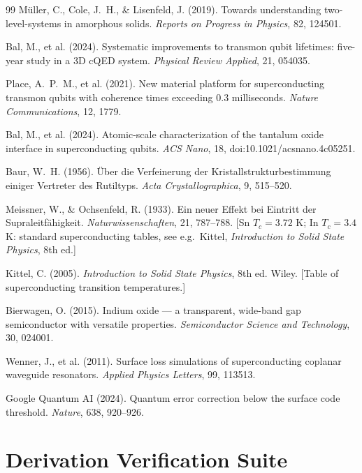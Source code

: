 \documentclass[12pt,a4paper]{article}
\begin{document}
\begin{thebibliography}{99}
M\"uller, C., Cole, J.\ H., \& Lisenfeld, J. (2019).
Towards understanding two-level-systems in amorphous solids.
\textit{Reports on Progress in Physics}, 82, 124501.

Bal, M., et al. (2024).
Systematic improvements to transmon qubit lifetimes: five-year
study in a 3D cQED system. \textit{Physical Review Applied}, 21, 054035.

Place, A.\ P.\ M., et al. (2021).
New material platform for superconducting transmon qubits with coherence
times exceeding 0.3 milliseconds.
\textit{Nature Communications}, 12, 1779.

Bal, M., et al. (2024).
Atomic-scale characterization of the tantalum oxide interface in
superconducting qubits. \textit{ACS Nano}, 18, doi:10.1021/acsnano.4c05251.

Baur, W.\ H. (1956).
\"Uber die Verfeinerung der Kristallstrukturbestimmung einiger Vertreter
des Rutiltyps. \textit{Acta Crystallographica}, 9, 515--520.

Meissner, W., \& Ochsenfeld, R. (1933).
Ein neuer Effekt bei Eintritt der Supraleitf\"ahigkeit.
\textit{Naturwissenschaften}, 21, 787--788.
[Sn $T_c = 3.72$ K; In $T_c = 3.4$ K: standard superconducting tables,
see e.g.\ Kittel, \textit{Introduction to Solid State Physics}, 8th ed.]

Kittel, C. (2005).
\textit{Introduction to Solid State Physics}, 8th ed.
Wiley. [Table of superconducting transition temperatures.]

Bierwagen, O. (2015).
Indium oxide --- a transparent, wide-band gap semiconductor with
versatile properties. \textit{Semiconductor Science and Technology}, 30, 024001.

Wenner, J., et al. (2011).
Surface loss simulations of superconducting coplanar waveguide resonators.
\textit{Applied Physics Letters}, 99, 113513.

Google Quantum AI (2024).
Quantum error correction below the surface code threshold.
\textit{Nature}, 638, 920--926.

\end{thebibliography}

\appendix
\section{Derivation Verification Suite}
\label{app:tests}
\end{document}
